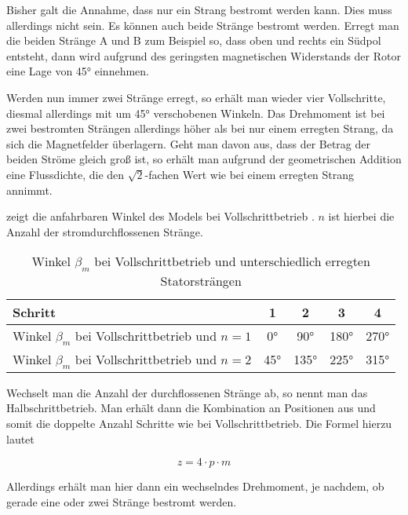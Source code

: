 Bisher galt die Annahme, dass nur ein Strang bestromt werden kann. Dies muss allerdings nicht sein. Es können auch beide Stränge bestromt werden. Erregt man die beiden Stränge A und B zum Beispiel so, dass oben und rechts ein Südpol entsteht, dann wird aufgrund des geringsten magnetischen Widerstands der Rotor eine Lage von 45° einnehmen.

Werden nun immer zwei Stränge erregt, so erhält man wieder vier Vollschritte, diesmal allerdings mit um 45° verschobenen Winkeln. Das Drehmoment ist bei zwei bestromten Strängen allerdings höher als bei nur einem erregten Strang, da sich die Magnetfelder überlagern. Geht man davon aus, dass der Betrag der beiden Ströme gleich groß ist, so erhält man aufgrund der geometrischen Addition eine Flussdichte, die den $\sqrt{2}$-fachen Wert wie bei einem erregten Strang annimmt.

 zeigt die anfahrbaren Winkel des Models bei Vollschrittbetrieb \cite{Schroeder2007}. $n$ ist hierbei die Anzahl der stromdurchflossenen Stränge.

\begin{table}[H]
\centering
\caption{Winkel $\beta_{m}$ bei Vollschrittbetrieb und unterschiedlich erregten Statorsträngen}
\begin{tabular}[t]{lcccc}
\toprule
Schritt & 1 & 2 & 3 & 4 \\
\midrule
Winkel $\beta_{m}$ bei Vollschrittbetrieb und $n=1$ & 0° & 90° & 180° & 270° \\
Winkel $\beta_{m}$ bei Vollschrittbetrieb und $n=2$ & 45° & 135° & 225° & 315° \\
\bottomrule
\end{tabular}

\label{tab:vollschritt}
\end{table}

Wechselt man die Anzahl der durchflossenen Stränge ab, so nennt man das Halbschrittbetrieb. Man erhält dann die Kombination an Positionen aus  und somit die doppelte Anzahl Schritte wie bei Vollschrittbetrieb. Die Formel hierzu lautet

\begin{equation}

z=4\cdot p \cdot m

\label{eq:halbschritt}
\end{equation}

Allerdings erhält man hier dann ein wechselndes Drehmoment, je nachdem, ob gerade eine oder zwei Stränge bestromt werden.


